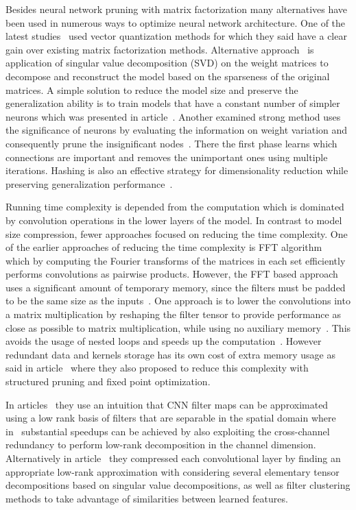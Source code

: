 \documentclass{article} %
\begin{document}
Besides neural network pruning with matrix factorization many alternatives have
been used in numerous ways to optimize neural network architecture. One of the
latest studies~\cite{DBLP:journals/corr/GongLYB14} used vector quantization
methods for which they said have a clear gain over existing matrix
factorization methods. Alternative approach~\cite{xue2013restructuring} is
application of singular value decomposition (SVD) on the weight matrices to
decompose and reconstruct the model based on the sparseness of the
original matrices. A simple solution to
reduce the model size and preserve the generalization ability is to train
models that have a constant number of simpler neurons which was presented in
article~\cite{collins2014memory}. Another examined strong method uses the 
significance of neurons by evaluating
the information on weight variation and consequently prune the insignificant
nodes~\cite{han2015learning}. There the first phase learns which 
connections are important and removes the unimportant ones using multiple 
iterations. Hashing is also an effective strategy for dimensionality reduction
while preserving generalization performance~\cite{weinberger2009feature,
shi2009hash, chen2015compressing}. 

Running time complexity is depended from the computation which is dominated by 
convolution operations in the lower layers of the model. In contrast to model 
size compression, fewer approaches focused on reducing the time complexity. One 
of the earlier approaches of reducing the 
time complexity is FFT algorithm~\cite{mathieu2013fast} which by computing the 
Fourier transforms of the matrices in each set efficiently performs 
convolutions as pairwise products. However, the FFT based approach uses a 
significant
amount of temporary memory, since the filters must be padded to be the same size 
as the 
inputs~\cite{chetlur2014cudnn}. One approach is to lower the convolutions into a 
matrix multiplication 
by reshaping the filter tensor to provide performance as close as possible to 
matrix 
multiplication, while using no auxiliary memory~\cite{chetlur2014cudnn}. This 
avoids the usage of nested loops and speeds up the 
computation~\cite{chellapilla2006high}. 
However redundant data and kernels storage has its own cost 
of extra memory usage as said in article~\cite{anwar2015structured} where they 
also proposed to 
reduce this complexity with structured pruning and fixed point optimization. 

In articles~\cite{jaderberg2014speeding, rigamonti2013learning} they use an
intuition that CNN filter maps can be approximated using a low rank basis of
filters that are separable in the spatial domain where 
in~\cite{jaderberg2014speeding}
substantial speedups can be achieved by also exploiting the cross-channel 
redundancy to perform low-rank decomposition in the
channel dimension. 
Alternatively in article~\cite{denton2014exploiting} they compressed each 
convolutional layer by finding an appropriate low-rank approximation with 
considering several elementary tensor decompositions based on singular value 
decompositions, as well as filter clustering methods to take advantage of 
similarities between learned features.
\end{document}
